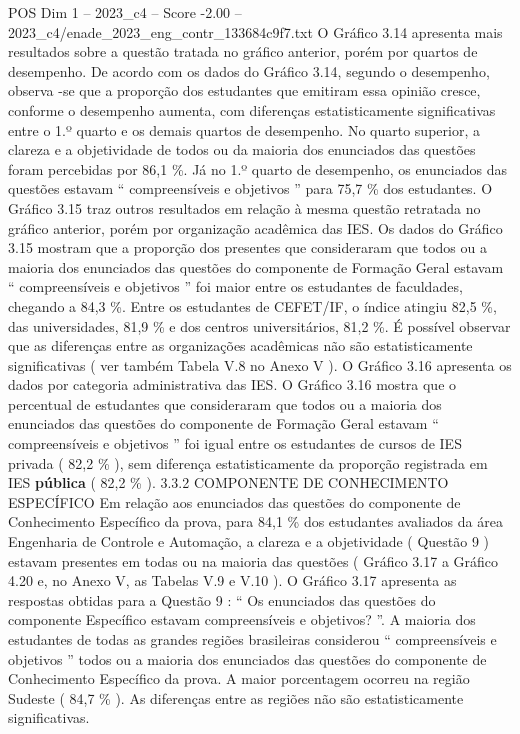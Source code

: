\begin{textsample}{POS Dim 1 – 2023\_c4 – Score -2.00 – 2023\_c4/enade\_2023\_eng\_contr\_133684c9f7.txt}
O Gráfico 3.14 apresenta mais resultados sobre a questão tratada no gráfico anterior, porém por quartos de desempenho.
De acordo com os dados do Gráfico 3.14, segundo o desempenho, observa -se que a proporção dos estudantes que emitiram essa opinião cresce, conforme o desempenho aumenta, com diferenças estatisticamente significativas entre o 1.º quarto e os demais quartos de desempenho.
No quarto superior, a clareza e a objetividade de todos ou da maioria dos enunciados das questões foram percebidas por 86,1 \%.
Já no 1.º quarto de desempenho, os enunciados das questões estavam “ compreensíveis e objetivos ” para 75,7 \% dos estudantes.
O Gráfico 3.15 traz outros resultados em relação à mesma questão retratada no gráfico anterior, porém por organização acadêmica das IES.
Os dados do Gráfico 3.15 mostram que a proporção dos presentes que consideraram que todos ou a maioria dos enunciados das questões do componente de Formação Geral estavam “ compreensíveis e objetivos ” foi maior entre os estudantes de faculdades, chegando a 84,3 \%.
Entre os estudantes de CEFET/IF, o índice atingiu 82,5 \%, das universidades, 81,9 \% e dos centros universitários, 81,2 \%.
É possível observar que as diferenças entre as organizações acadêmicas não são estatisticamente significativas ( ver também Tabela V.8 no Anexo V ).
O Gráfico 3.16 apresenta os dados por categoria administrativa das IES.
O Gráfico 3.16 mostra que o percentual de estudantes que consideraram que todos ou a maioria dos enunciados das questões do componente de Formação Geral estavam “ compreensíveis e objetivos ” foi igual entre os estudantes de cursos de IES privada ( 82,2 \% ), sem diferença estatisticamente da proporção registrada em IES \textbf{pública} ( 82,2 \% ). 3.3.2 COMPONENTE DE CONHECIMENTO ESPECÍFICO Em relação aos enunciados das questões do componente de Conhecimento Específico da prova, para 84,1 \% dos estudantes avaliados da área Engenharia de Controle e Automação, a clareza e a objetividade ( Questão 9 ) estavam presentes em todas ou na maioria das questões ( Gráfico 3.17 a Gráfico 4.20 e, no Anexo V, as Tabelas V.9 e V.10 ).
O Gráfico 3.17 apresenta as respostas obtidas para a Questão 9 : “ Os enunciados das questões do componente Específico estavam compreensíveis e objetivos? ”.
A maioria dos estudantes de todas as grandes regiões brasileiras considerou “ compreensíveis e objetivos ” todos ou a maioria dos enunciados das questões do componente de Conhecimento Específico da prova.
A maior porcentagem ocorreu na região Sudeste ( 84,7 \% ).
As diferenças entre as regiões não são estatisticamente significativas.

\end{textsample}

